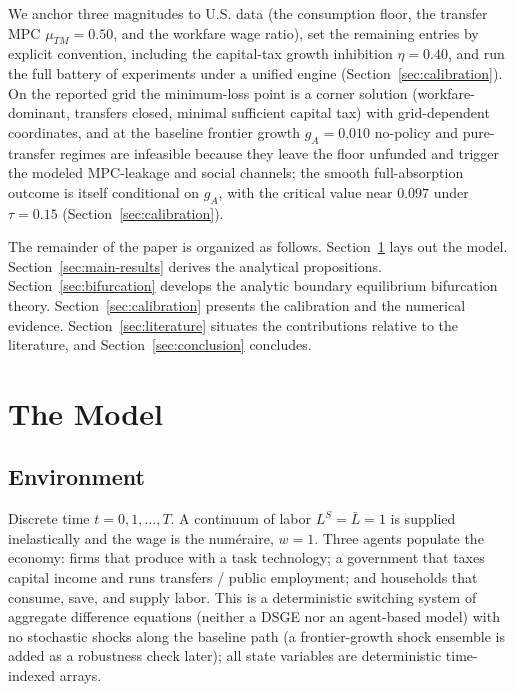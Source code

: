 \documentclass[review,12pt]{elsarticle}
\theoremstyle{plain}
\theoremstyle{definition}
\theoremstyle{remark}
\newcommand{\barL}{\bar{L}}
\begin{document}
We anchor three magnitudes to U.S. data (the consumption floor, the transfer MPC $\mu_{TM}=0.50$, and the workfare wage ratio), set the remaining entries by explicit convention, including the capital-tax growth inhibition $\eta=0.40$, and run the full battery of experiments under a unified engine (Section~\ref{sec:calibration}). On the reported grid the minimum-loss point is a corner solution (workfare-dominant, transfers closed, minimal sufficient capital tax) with grid-dependent coordinates, and at the baseline frontier growth $g_A=0.010$ no-policy and pure-transfer regimes are infeasible because they leave the floor unfunded and trigger the modeled MPC-leakage and social channels; the smooth full-absorption outcome is itself conditional on $g_A$, with the critical value near $0.097$ under $\tau=0.15$ (Section~\ref{sec:calibration}).

The remainder of the paper is organized as follows. Section~\ref{sec:model} lays out the model. Section~\ref{sec:main-results} derives the analytical propositions. Section~\ref{sec:bifurcation} develops the analytic boundary equilibrium bifurcation theory. Section~\ref{sec:calibration} presents the calibration and the numerical evidence. Section~\ref{sec:literature} situates the contributions relative to the literature, and Section~\ref{sec:conclusion} concludes.

\section{The Model}
\label{sec:model}

\subsection{Environment}
Discrete time $t=0,1,\dots,T$. A continuum of labor $L^S=\barL=1$ is supplied inelastically and the wage is the num\'eraire, $w=1$. Three agents populate the economy: firms that produce with a task technology; a government that taxes capital income and runs transfers / public employment; and households that consume, save, and supply labor. This is a deterministic switching system of aggregate difference equations (neither a DSGE nor an agent-based model) with no stochastic shocks along the baseline path (a frontier-growth shock ensemble is added as a robustness check later); all state variables are deterministic time-indexed arrays.
\end{document}
